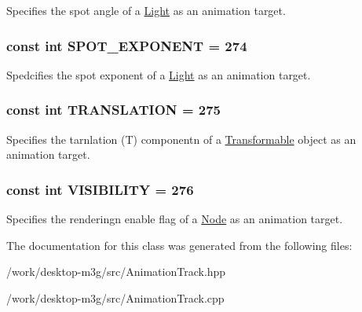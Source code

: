 Specifies the spot angle of a \hyperlink{classm3g_1_1Light}{Light} as an animation target. \hypertarget{classm3g_1_1AnimationTrack_90c55bd356e55166244416c6f758ea94}{
\subsubsection[{SPOT\_\-EXPONENT}]{\setlength{\rightskip}{0pt plus 5cm}const int {\bf SPOT\_\-EXPONENT} = 274}}
\label{classm3g_1_1AnimationTrack_90c55bd356e55166244416c6f758ea94}


Spedcifies the spot exponent of a \hyperlink{classm3g_1_1Light}{Light} as an animation target. \hypertarget{classm3g_1_1AnimationTrack_a691826dccd8c22144e61216de4f680c}{
\subsubsection[{TRANSLATION}]{\setlength{\rightskip}{0pt plus 5cm}const int {\bf TRANSLATION} = 275}}
\label{classm3g_1_1AnimationTrack_a691826dccd8c22144e61216de4f680c}


Specifies the tarnlation (T) componentn of a \hyperlink{classm3g_1_1Transformable}{Transformable} object as an animation target. \hypertarget{classm3g_1_1AnimationTrack_f248c44b5d4962472c6533cdeffc6fe9}{
\subsubsection[{VISIBILITY}]{\setlength{\rightskip}{0pt plus 5cm}const int {\bf VISIBILITY} = 276}}
\label{classm3g_1_1AnimationTrack_f248c44b5d4962472c6533cdeffc6fe9}


Specifies the renderingn enable flag of a \hyperlink{classm3g_1_1Node}{Node} as an animation target. 

The documentation for this class was generated from the following files:\begin{CompactItemize}
\item 
/work/desktop-m3g/src/AnimationTrack.hpp\item 
/work/desktop-m3g/src/AnimationTrack.cpp\end{CompactItemize}

